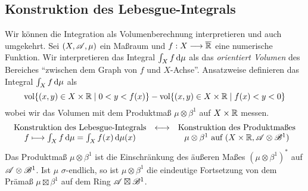 \subsection{Konstruktion des Lebesgue-Integrals}

Wir können die Integration als Volumenberechnung interpretieren und auch umgekehrt. Sei $(X,\AA,\mu)$ ein Maßraum und $f:X \longrightarrow \ol\R$ eine numerische Funktion. Wir interpretieren das Integral $\int_X f \D \mu$ als das \emph{orientiert Volumen} des Bereiches ``zwischen dem Graph von $f$ und $X$-Achse''. Ansatzweise definieren das Integral $\int_X f \D \mu$ als
$$
\vol \{ (x,y) \in X \times \R \mid 0<y<f(x)\}-\vol \{(x,y)\in X \times \R \mid f(x)<y<0\}
$$
wobei wir das Volumen mit dem Produktmaß $\mu \otimes \beta^1$ auf $X\times \R$ messen.\\
\begin{equation*}
\begin{array}{ccc}
\te{Konstruktion des Lebesgue-Integrals} & \longleftrightarrow & \te{Konstruktion des Produktmaßes} \\
f \longmapsto \int_X f \D \mu = \int_X f(x)\D \mu(x) &&\mu \otimes \beta^1 \te{ auf } (X \times \R, \AA \otimes \BB^1) 
\end{array}
\end{equation*}
Das Produktmaß $\mu \otimes \beta^1$ ist die Einschränkung des äußeren Maßes $(\mu \otimes \beta^1)^*$ auf $\AA \otimes \BB^1$. Ist $\mu$ $\sigma$-endlich, so 
ist $\mu \otimes \beta^1$ die eindeutige Fortsetzung von dem Prämaß $\mu \boxtimes \beta^1$ auf dem Ring $\AA \boxtimes \BB^1$.

